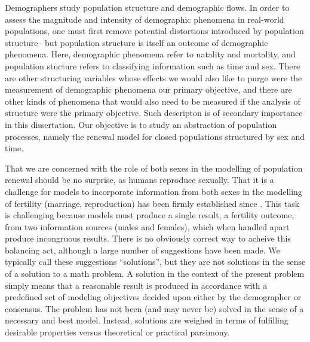 Demographers study population structure and demographic flows. In order
to assess the magnitude and intensity of demographic phenomena in real-world
populations, one must first remove potential distortions introduced by
population structure-- but population structure is itself an outcome
of demographic phenomena. Here, demographic phenomena refer to natality and
mortality, and population stucture refers to classifying information such as
time and sex. There are other structuring variables whose effects we would also
like to purge were the measurement of demographic phenomena 
our primary objective, and there are other kinds of phenomena that would also
need to be measured if the analysis of structure were the primary
objective. Such descripton is of secondary importance in this dissertation. Our
objective is to study an abstraction of population processes, namely the 
renewal model for closed populations structured by sex and time.

That we are concerned with the role of both sexes in the modelling of population
renewal should be no surprise, as humans reproduce sexually. That it is a
challenge for models to incorporate information from both sexes in the modelling
of fertility (marriage, reproduction) has been firmly established since
\citet{karmel1947relations}. This task is challenging because models must
produce a single result, a fertility outcome, from two information sources
(males and females), which when handled apart produce incongruous results. 
There is no obviously correct way to acheive this balancing act, although a large number of
suggestions have been made. We typically call these suggestions ``solutions'',
but they are not solutions in the sense of a solution to a math problem. A
solution in the context of the present problem simply means that a reasonable
result is produced in accordance with a predefined set of modeling objectives
decided upon either by the demographer or consensus. The problem has not been
(and may never be) solved in the sense of a necessary and best model. Instead,
solutions are weighed in terms of fulfilling desirable properties versus theoretical 
or practical parsimony.

